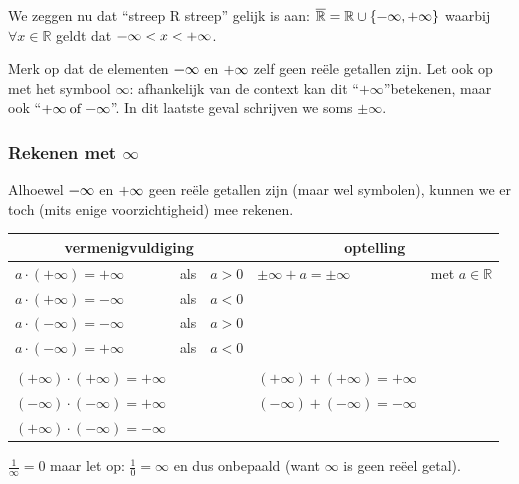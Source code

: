 We zeggen nu dat ``streep R streep'' gelijk is aan: $\overline{\mathbb{R}}=\mathbb{R}\cup\{\text{\textminus\ensuremath{\infty}},+\text{\ensuremath{\infty}}\}$
waarbij $\forall x\in\mathbb{R}$ geldt dat $\text{\textminus\ensuremath{\infty}}<x<+\text{\ensuremath{\infty}}$.




Merk op dat de elementen $\text{\textminus\ensuremath{\infty}}$
en $+\text{\ensuremath{\infty}}$ zelf geen re\"ele getallen zijn. Let
ook op met het symbool $\infty$: afhankelijk van de context kan dit
\textquotedblleft$+\infty$\textquotedblright betekenen, maar ook \textquotedblleft$+\infty\:\mathrm{of}\:\text{\textminus\ensuremath{\infty}}$\textquotedblright.
In dit laatste geval schrijven we soms $\pm\infty$.


\subsubsection{Rekenen met $\infty$}

Alhoewel $\text{\textminus\ensuremath{\infty}}$ en $+\text{\ensuremath{\infty}}$
geen re\"ele getallen zijn (maar wel symbolen), kunnen we er toch (mits
enige voorzichtigheid) mee rekenen.



\begin{tabel*}{}
	\centering
	\begin{tabular}{lcc|ll}
		\multicolumn{3}{c|}{vermenigvuldiging} & \multicolumn{2}{c}{optelling}\\
		\hline 
		$a\cdot (+\infty)=+\infty$ & als & $a>0$ & $\pm\infty+a=\pm\infty$ & met $a\in\mathbb{R}$\\
		$a\cdot (+\infty)=-\infty$ & als & $a<0$ &  & \\
		$a\cdot (-\infty)=-\infty$ & als & $a>0$ &  & \\
		$a\cdot (-\infty)=+\infty$ & als & $a<0$ &  & \\
		&  &  &  & \\
		$(+\infty)\cdot (+\infty)=+\infty$ &  &   & $(+\infty)+(+\infty)=+\infty$ & \\
		$(-\infty)\cdot (-\infty)=+\infty$ &  &   & $(-\infty)+(-\infty)=-\infty$ & \\
		$(+\infty)\cdot (-\infty)=-\infty$ &  &   &  & \\
	\end{tabular}
\end{tabel*}




$\frac{1}{\infty}=0$ maar let op: $\frac{1}{0}=\infty$
en dus onbepaald (want $\infty$ is geen re\"eel getal).

